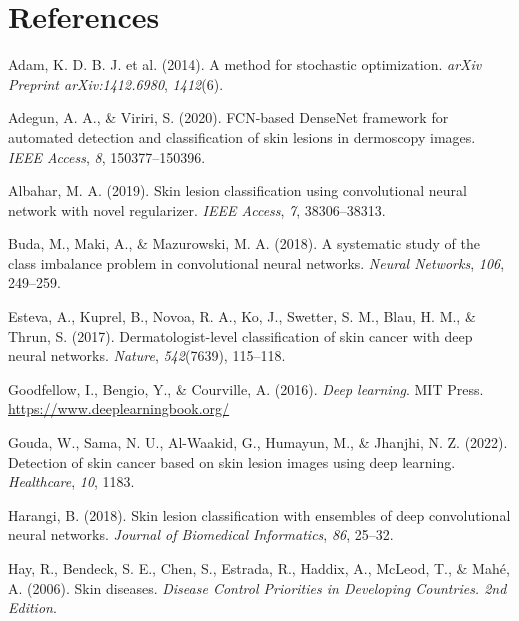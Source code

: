 \documentclass[
  12pt,
  oneside]{article}
\newlength{\cslhangindent}
\newenvironment{CSLReferences}[2] %
 {\begin{list}{}{%
  \setlength{\itemindent}{0pt}
  \setlength{\leftmargin}{0pt}
  \setlength{\parsep}{0pt}
  \ifodd #1
   \setlength{\leftmargin}{\cslhangindent}
   \setlength{\itemindent}{-1\cslhangindent}
  \fi
  \setlength{\itemsep}{#2\baselineskip}}}
 {\end{list}}
\begin{document}
\newpage

\section*{References}\label{references}

\label{refs}
\begin{CSLReferences}{1}{0}
Adam, K. D. B. J. et al. (2014). A method for stochastic optimization.
\emph{arXiv Preprint arXiv:1412.6980}, \emph{1412}(6).

Adegun, A. A., \& Viriri, S. (2020). FCN-based DenseNet framework for
automated detection and classification of skin lesions in dermoscopy
images. \emph{IEEE Access}, \emph{8}, 150377--150396.

Albahar, M. A. (2019). Skin lesion classification using convolutional
neural network with novel regularizer. \emph{IEEE Access}, \emph{7},
38306--38313.

Buda, M., Maki, A., \& Mazurowski, M. A. (2018). A systematic study of
the class imbalance problem in convolutional neural networks.
\emph{Neural Networks}, \emph{106}, 249--259.

Esteva, A., Kuprel, B., Novoa, R. A., Ko, J., Swetter, S. M., Blau, H.
M., \& Thrun, S. (2017). Dermatologist-level classification of skin
cancer with deep neural networks. \emph{Nature}, \emph{542}(7639),
115--118.

Goodfellow, I., Bengio, Y., \& Courville, A. (2016). \emph{Deep
learning}. MIT Press. \url{https://www.deeplearningbook.org/}

Gouda, W., Sama, N. U., Al-Waakid, G., Humayun, M., \& Jhanjhi, N. Z.
(2022). Detection of skin cancer based on skin lesion images using deep
learning. \emph{Healthcare}, \emph{10}, 1183.

Harangi, B. (2018). Skin lesion classification with ensembles of deep
convolutional neural networks. \emph{Journal of Biomedical Informatics},
\emph{86}, 25--32.

Hay, R., Bendeck, S. E., Chen, S., Estrada, R., Haddix, A., McLeod, T.,
\& Mahé, A. (2006). Skin diseases. \emph{Disease Control Priorities in
Developing Countries. 2nd Edition}.


\end{CSLReferences}
\end{document}
